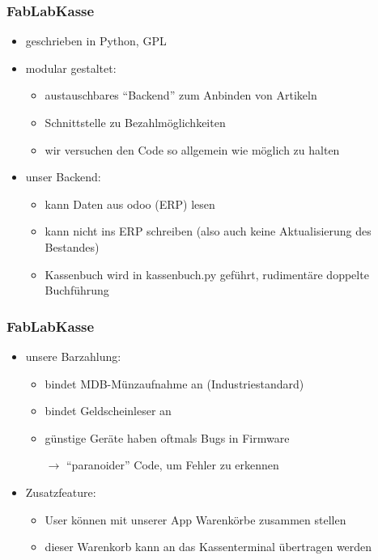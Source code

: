 \documentclass[german]{beamer} %
\begin{document}
\begin{frame}
\frametitle{FabLabKasse}
 \begin{itemize}
  \item geschrieben in Python, GPL
  \item modular gestaltet:
    \begin{itemize}
     \item austauschbares \enquote{Backend} zum Anbinden von Artikeln
     \item Schnittstelle zu Bezahlmöglichkeiten
     \item wir versuchen den Code so allgemein wie möglich zu halten
    \end{itemize}
  \item unser Backend:
    \begin{itemize}
      \item kann Daten aus odoo (ERP) lesen
      \item kann nicht ins ERP schreiben (also auch keine Aktualisierung des Bestandes)
      \item Kassenbuch wird in kassenbuch.py geführt, rudimentäre doppelte Buchführung
    \end{itemize}
  \end{itemize}
\end{frame}
\begin{frame}
\frametitle{FabLabKasse}
  \begin{itemize}
  \item unsere Barzahlung:
     \begin{itemize}
        \item bindet MDB-Münzaufnahme an (Industriestandard)
        \item bindet Geldscheinleser an
        \item günstige Geräte haben oftmals Bugs in Firmware
        \item[$\rightarrow$] \enquote{paranoider} Code, um Fehler zu erkennen
     \end{itemize}
  \item Zusatzfeature:
     \begin{itemize}
       \item User können mit unserer App Warenkörbe zusammen stellen
       \item dieser Warenkorb kann an das Kassenterminal übertragen werden
     \end{itemize} 
 \end{itemize}
\end{frame}
\end{document}

